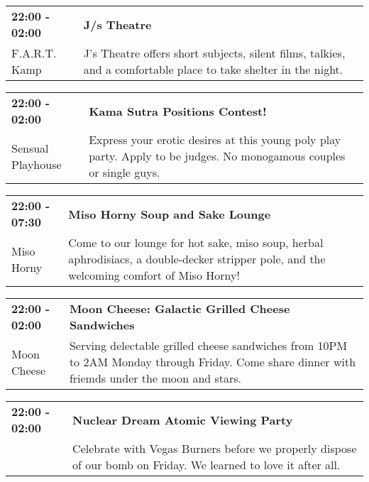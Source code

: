 \begin{tabular}{ p{1in} p{2.2in} }
    \textbf{22:00 - 02:00} & \textbf{J/s Theatre} \\
    F.A.R.T. Kamp \newline  & J's Theatre offers short subjects, silent films, talkies, and a comfortable place to take shelter in the night. \\
    \hline 
\end{tabular}
    
\begin{tabular}{ p{1in} p{2.2in} }
    \textbf{22:00 - 02:00} & \textbf{Kama Sutra Positions Contest!} \\
    Sensual Playhouse \newline  & Express your erotic desires at this young poly play party. Apply to be judges. No monogamous couples or single guys. \\
    \hline 
\end{tabular}
    
\begin{tabular}{ p{1in} p{2.2in} }
    \textbf{22:00 - 07:30} & \textbf{Miso Horny Soup and Sake Lounge} \\
    Miso Horny \newline  & Come to our lounge for hot sake, miso soup, herbal aphrodisiacs, a double-decker stripper pole, and the welcoming comfort of Miso Horny! \\
    \hline 
\end{tabular}
    
\begin{tabular}{ p{1in} p{2.2in} }
    \textbf{22:00 - 02:00} & \textbf{Moon Cheese: Galactic Grilled Cheese Sandwiches} \\
    Moon Cheese \newline  & Serving delectable grilled cheese sandwiches from 10PM to 2AM Monday through Friday. Come share dinner with friemds under the moon and stars. \\
    \hline 
\end{tabular}
    
\begin{tabular}{ p{1in} p{2.2in} }
    \textbf{22:00 - 02:00} & \textbf{Nuclear Dream Atomic Viewing Party} \\
    ~ \newline  & Celebrate with Vegas Burners before we properly dispose of our bomb on Friday. We learned to love it after all. \\
    \hline 
\end{tabular}
    
